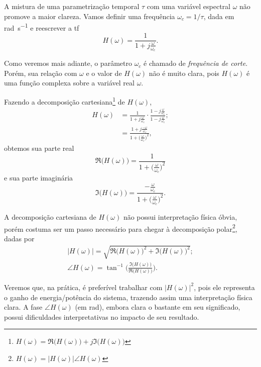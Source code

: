 A mistura de uma parametrização temporal $\tau$ com uma variável espectral $\omega$ não promove a maior clareza. Vamos definir uma frequência $\omega_c=1\slash\tau$, dada em \unit{\radian\per\second} e reescrever a \ac{tf}
\begin{equation}
	H(\omega)=\frac{1}{\displaystyle1+j\frac{\omega}{\omega_c}}.
\end{equation}

Como veremos mais adiante, o parâmetro $\omega_c$ é chamado de \emph{frequência de corte}. Porém, sua relação com $\omega$ e o valor de $H(\omega)$ não é muito clara, pois $H(\omega)$ é uma função complexa sobre a variável real $\omega$.

Fazendo a decomposição cartesiana\footnote{$H(\omega)=\Re\big(H(\omega)\big)+j\Im\big(H(\omega)\big)$} de $H(\omega)$,
\begin{equation*}\begin{aligned}
	H(\omega)&=\frac{1}{\displaystyle1+j\frac{\omega}{\omega_c}}\cdot\frac{\displaystyle1-j\frac{\omega}{\omega_c}}{\displaystyle1-j\frac{\omega}{\omega_c}};\\
			 &=\frac{\displaystyle1+j\frac{-\omega}{\omega_c}}{\displaystyle1+\Big(\frac{\omega}{\omega_c}\Big)^2},
\end{aligned}\end{equation*}
obtemos sua parte real
\begin{equation}
	\Re\big(H(\omega)\big)=\frac{1}{\displaystyle1+\Big(\frac{\omega}{\omega_c}\Big)^2}
\end{equation}
e sua parte imaginária
\begin{equation}
	\Im\big(H(\omega)\big)=\frac{\displaystyle-\frac{\omega}{\omega_c}}{\displaystyle1+\Big(\frac{\omega}{\omega_c}\Big)^2}.
\end{equation}

A decomposição cartesiana de $H(\omega)$ não possui interpretação física óbvia, porém costuma ser um passo necessário para chegar à decomposição polar\footnote{$H(\omega)=|H(\omega)|\angle H(\omega)$}, dadas por
\begin{gather}
	|H(\omega)|=\sqrt{\Re\big(H(\omega)\big)^2+\Im\big(H(\omega)\big)^2};\\
	\angle H(\omega)=\tan^{-1}\bigg(\frac{\Im\big(H(\omega)\big)}{\Re\big(H(\omega)\big)}\bigg).
\end{gather}

Veremos que, na prática, é preferível trabalhar com $|H(\omega)|^2$, pois ele representa o ganho de energia\slash potência do sistema, trazendo assim uma interpretação física clara. A fase $\angle H(\omega)$ (em \unit{\radian}), embora clara o bastante em seu significado, possui dificuldades interpretativas no impacto de seu resultado.

